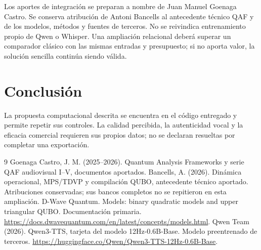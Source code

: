 \documentclass[10pt,a4paper]{article}
\begin{document}
Los aportes de integración se preparan a nombre de Juan Manuel Goenaga Castro. Se conserva atribución de Antoni Bancells al antecedente técnico QAF y de los modelos, métodos y fuentes de terceros. No se reivindica entrenamiento propio de Qwen o Whisper. Una ampliación relacional deberá superar un comparador clásico con las mismas entradas y presupuesto; si no aporta valor, la solución sencilla continúa siendo válida.
\section{Conclusión}
La propuesta computacional descrita se encuentra en el código entregado y permite repetir sus controles. La calidad percibida, la autenticidad vocal y la eficacia comercial requieren sus propios datos; no se declaran resueltas por completar una exportación.
\begin{thebibliography}{9}
 Goenaga Castro, J. M. (2025--2026). Quantum Analysis Frameworks y serie QAF audiovisual I--V, documentos aportados. Bancells, A. (2026). Dinámica operacional, MPS/TDVP y compilación QUBO, antecedente técnico aportado. Atribuciones conservadas; sus bancos completos no se repitieron en esta ampliación.
 D-Wave Quantum. Models: binary quadratic models and upper triangular QUBO. Documentación primaria. \url{https://docs.dwavequantum.com/en/latest/concepts/models.html}.
 Qwen Team (2026). Qwen3-TTS, tarjeta del modelo 12Hz-0.6B-Base. Modelo preentrenado de terceros. \url{https://huggingface.co/Qwen/Qwen3-TTS-12Hz-0.6B-Base}.
\end{thebibliography}
\end{document}

